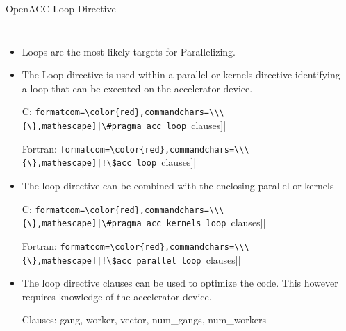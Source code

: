 \documentclass[c,mathserif,compress,xcolor=svgnames]{beamer}
\newcommand{\Verbred}[1]{\Verb[formatcom=\color{red},commandchars=\\\{\},mathescape]|#1|}
\newenvironment{eblock}[0]
{
\begin{beamerboxesrounded}[upper=uppercol2,lower=lowercol2,shadow=true]}
{\end{beamerboxesrounded}}
\begin{document}
\begin{frame}[fragile]{\small OpenACC Loop Directive}
  \begin{columns}
    \begin{itemize}
      \item Loops are the most likely targets for Parallelizing.
      \item The Loop directive is used within a parallel or kernels directive identifying a loop that can be executed on the accelerator device.
      \item[C:] \Verbred{\#pragma acc loop [clauses]}
      \item[Fortran:] \Verbred{!\$acc loop [clauses]}
      \item The loop directive can be combined with the enclosing parallel or kernels
      \item[C:] \Verbred{\#pragma acc kernels loop [clauses]}
      \item[Fortran:] \Verbred{!\$acc parallel loop [clauses]}
      \item The loop directive clauses can be used to optimize the code. This however requires knowledge of the accelerator device.
      \item[Clauses:] gang, worker, vector, num\_gangs, num\_workers
    \end{itemize}
    \begin{eblock}{}
      
      
    \end{eblock}
  \end{columns}
\end{frame}
\end{document}

